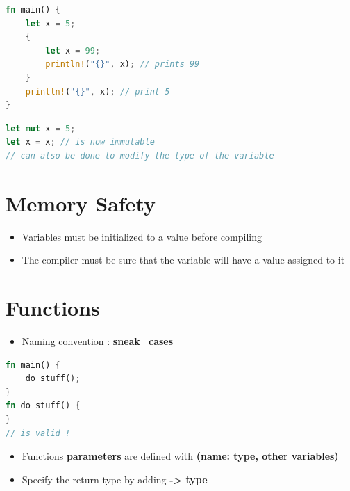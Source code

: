 \documentclass{report}
\begin{document}
\begin{multicols*}{2}
\begin{tcolorbox}[title=Shadowing,colback=backcolour,size=small,left=4mm]
\begin{lstlisting}[language=rust]
fn main() {
	let x = 5;
	{
		let x = 99;
		println!("{}", x); // prints 99
	}
	println!("{}", x); // print 5
}
\end{lstlisting}
\end{tcolorbox}

\begin{tcolorbox}[title=Shadowing in the same scope,colback=backcolour,size=small,left=4mm]
\begin{lstlisting}[language=rust]
let mut x = 5;
let x = x; // is now immutable
// can also be done to modify the type of the variable
\end{lstlisting}
\end{tcolorbox}


\section{Memory Safety}
\begin{itemize}
	\item Variables must be initialized to a value before compiling 
	\item The compiler must be sure that the variable will have a value assigned to it
\end{itemize}


\section{Functions}

\begin{itemize}
	\item Naming convention : \textbf{sneak\_cases}
\end{itemize}

\begin{tcolorbox}[title=Functions doesn't have to appear before we call them,colback=backcolour,size=small,left=4mm]
\begin{lstlisting}[language=rust]
fn main() {
	do_stuff();
}
fn do_stuff() {
}
// is valid !
\end{lstlisting}
\end{tcolorbox}

\begin{itemize}
	\item Functions \textbf{parameters} are defined with \textbf{(name: type, other variables)} 
	\item Specify the return type by adding \textbf{-> type}  
\end{itemize}


\end{multicols*}
\end{document}
